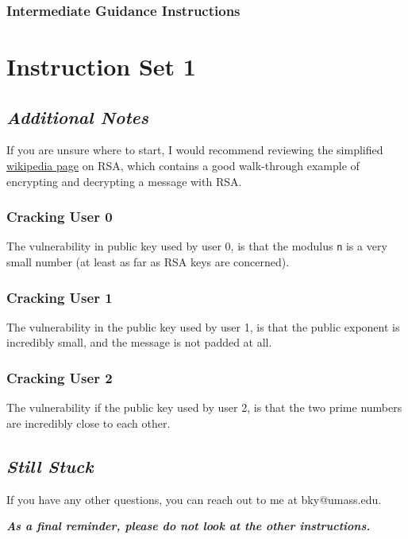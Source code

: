         \subsubsection{Intermediate Guidance Instructions}
            {\parindent0pt\singlespacing
                \section*{Instruction Set 1}
                    \subsection*{\textit{Additional Notes}}
                        If you are unsure where to start, I would recommend reviewing the simplified \href{https://simple.wikipedia.org/wiki/RSA_algorithm}{wikipedia page} on RSA, which contains a good walk-through example of encrypting and decrypting a message with RSA.

                        \subsubsection*{Cracking User 0}
                            The vulnerability in public key used by user 0, is that the modulus \lstinline`n` is a very small number (at least as far as RSA keys are concerned).
                        \subsubsection*{Cracking User 1}
                            The vulnerability in the public key used by user 1, is that the public exponent is incredibly small, and the message is not padded at all. 
                        \subsubsection*{Cracking User 2}
                            The vulnerability if the public key used by user 2, is that the two prime numbers are incredibly close to each other. 
                    \subsection*{\textit{Still Stuck}}
                        If you have any other questions, you can reach out to me at bky@umass.edu. 

                    \textbf{\textit{As a final reminder, please do not look at the other instructions.}}
            }
        \newpage
